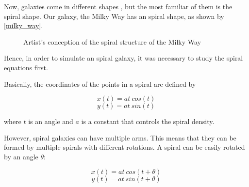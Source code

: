 \documentclass[a4paper,11pt,titlepage,abstract,numbers=noenddot,automark,mnsy,intlimits,rgb,dvipsnames]{report}
\begin{document}
Now, galaxies come in different shapes \cite{galaxy_shapes}, but the most familiar of them is the spiral shape. Our galaxy,
the Milky Way has an spiral shape, as shown by \autoref{milky_way}.
\begin{figure}[H]
\begin{center}
\noindent{}
\end{center}
\caption{Artist's conception of the spiral structure of the Milky Way \cite{milky_way_concept}}
\label{milky_way}
\end{figure}
Hence, in order to simulate an spiral galaxy, it was necessary to study the spiral equations \cite{spiral_equations} first.

Basically, the coordinates of the points in a spiral are defined by

$$x(t) = at \: cos(t)$$
$$y(t) = at \: sin(t)$$

where $t$ is an angle and $a$ is a constant that controls the spiral density.

However, spiral galaxies can have multiple arms. This means that they can be formed by multiple spirals with different rotations.
A spiral can be easily rotated by an angle $\theta$:

$$x(t) = at \: cos(t + \theta)$$
$$y(t) = at \: sin(t + \theta)$$
\end{document}
